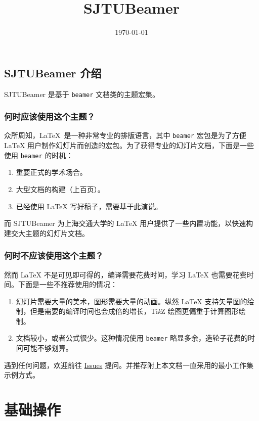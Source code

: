 \documentclass[
    UTF8,
    heading=true,
    12pt,
    a4paper
]{ctexrep}
\newcommand{\cls}[1]{\texttt{#1}}
\def\themename{\textsf{SJTUBeamer}}
\begin{document}
\title{\themename}
\date{\today}

\chapter*{\themename{} 介绍}

\themename{} 是基于 \cls{beamer} 文档类的主题宏集。

\section*{何时应该使用这个主题？}
众所周知，\LaTeX\ 是一种非常专业的排版语言，其中 \cls{beamer} 宏包是为了方便
\LaTeX{} 用户制作幻灯片而创造的宏包。为了获得专业的幻灯片文档，下面是一些使用
\cls{beamer} 的时机：
\begin{enumerate}
  \item 重要正式的学术场合。
  \item 大型文档的构建（上百页）。
  \item 已经使用 \LaTeX{} 写好稿子，需要基于此演说。
\end{enumerate}

而 \themename{} 为上海交通大学的 \LaTeX{}
用户提供了一些内置功能，以快速构建交大主题的幻灯片文档。

\section*{何时不应该使用这个主题？}
然而 \LaTeX{} 不是可见即可得的，编译需要花费时间，学习 \LaTeX{}
也需要花费时间。下面是一些不推荐使用的情况：
\begin{enumerate}
  \item 幻灯片需要大量的美术，图形需要大量的动画。纵然 \LaTeX{}
        支持矢量图的绘制，但是需要的编译时间也会成倍的增长，Ti\emph{k}Z
        绘图更偏重于计算图形绘制。
  \item 文档较小，或者公式很少。这种情况使用 \cls{beamer}
        略显多余，造轮子花费的时间可能不够划算。
\end{enumerate}

遇到任何问题，欢迎前往
\href{https://github.com/sjtug/SJTUBeamer/issues}
{Issues} 提问。并推荐附上本文档一直采用的最小工作集示例方式。

\setcounter{tocdepth}{0}
\tableofcontents

\part{基础操作}
\end{document}

